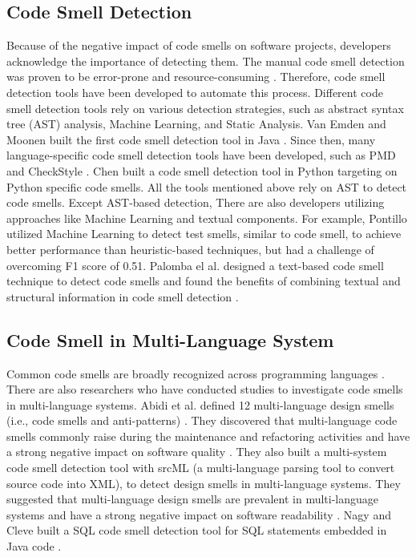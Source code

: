 \subsection{Code Smell Detection}
\label{sec:Code Smell Detection}
Because of the negative impact of code smells on software projects, developers acknowledge the importance of detecting them. The manual code smell detection was proven to be
error-prone and resource-consuming \cite{DetectingDefectsInObject-orientedDesigns}. Therefore, code smell detection tools have been developed to automate this process.
Different code smell detection tools rely on various detection strategies, such as abstract syntax tree (AST) analysis, Machine Learning, and Static Analysis.
Van Emden and Moonen built the first code smell detection tool in Java \cite{1173068}. Since then,
many language-specific code smell detection tools have been developed, such as PMD \cite{PMD} and CheckStyle \cite{CheckStyle}.
Chen \cite{Pysmell} built a code smell detection tool in Python targeting on Python specific code smells.
All the tools mentioned above rely on AST to detect code smells. Except AST-based detection, There are also developers utilizing approaches like Machine Learning and textual components. 
For example, Pontillo utilized Machine Learning to detect test smells, similar to code smell, to achieve better performance than heuristic-based techniques, but had a challenge of overcoming F1 score of 0.51.
Palomba el al. designed a text-based code smell technique to detect code smells and found the benefits of combining textual and structural information in code smell detection \cite{Palomba}.
\subsection{Code Smell in Multi-Language System}
\label{sec: Code Smell in Multi-Language System}

Common code smells are broadly recognized across programming languages \cite{PMD,CheckStyle,Pysmell,Jscent,DesigniteJava}. 
There are also researchers who have conducted studies to investigate code smells in multi-language systems.
Abidi et al. defined 12 multi-language design smells (i.e., code smells and anti-patterns) \cite{MultiLanguageCodeSmells}. They discovered that multi-language code smells commonly raise during the maintenance and refactoring activities
 and have a strong negative impact on software quality \cite{Abidi2}. They also built a multi-system code smell detection tool with srcML (a multi-language parsing tool to convert source code into XML), to
 detect design smells in multi-language systems. They suggested that multi-language design smells are prevalent in multi-language systems and have a strong negative impact on software readability \cite{Fault-Prone}.
Nagy and Cleve built a SQL code smell detection tool for SQL statements embedded in Java code \cite{SQLInJava}.
